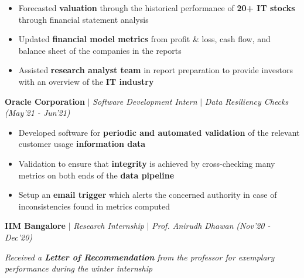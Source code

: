 \documentclass[10pt]{article}
\begin{document}
    \begin{itemize}[label={\textbullet},itemsep = -1 mm, leftmargin=*]
        
        \item Forecasted \textbf{valuation} through the historical performance of \textbf{20+ IT stocks} through financial statement analysis
        \item Updated \textbf{financial model metrics} from profit \& loss, cash flow, and balance sheet of the companies in the reports
        \item Assisted \textbf{research analyst team} in report preparation to provide investors with an overview of the \textbf{IT industry}
    \end{itemize}
\vspace{-6pt}
\textbf{Oracle Corporation} \textbf{$|$} {\textit{Software Development Intern} \textbf{$|$} \textit{Data Resiliency Checks}} \hfill{\sl \small (May'21 - Jun'21)}  	\\
    \vspace{-0.3cm}
    \hline
    \vspace{-3pt}

    \begin{itemize}[label={\textbullet},itemsep = -1 mm, leftmargin=*]
         \item Developed software for \textbf{periodic and automated validation} of the relevant customer usage \textbf{information data}
        \item Validation to ensure that \textbf{integrity} is achieved by cross-checking many metrics on both ends of the \textbf{data pipeline}
        \item Setup an \textbf{email trigger} which alerts the concerned authority in case of inconsistencies found in metrics computed
       
    \end{itemize}
\vspace{-6pt}
\textbf{IIM Bangalore} $|$ \textit{Research Internship} $|$ \textit{Prof. Anirudh Dhawan} \hfill{\sl \small (Nov'20 - Dec’20)}  \\
  \vspace{-0.3cm}
 \hline 
 \vspace{-4pt}
 \begin{flushleft}
\textit{Received a \textbf{Letter of Recommendation} from the professor for exemplary performance during the winter internship}
 \end{flushleft}
\end{document}
